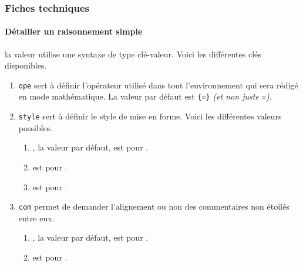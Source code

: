 \documentclass[12pt,a4paper]{article}
\begin{document}


\subsubsection{Fiches techniques}

\paragraph{Détailler un raisonnement simple} 


\IDoption{} la valeur utilise une syntaxe de type clé-valeur. Voici les différentes clés disponibles.

\begin{enumerate}
	\item \verb+ope+ sert à définir l'opérateur utilisé dans tout l'environnement qui sera rédigé en mode mathématique. 
	      La valeur par défaut est \verb+{=}+ \emph{(et non juste \texttt{=})}.

	\item \verb+style+ sert à définir le style de mise en forme. Voici les différentes valeurs possibles.
	      \begin{enumerate}
	      		\item {}, la valeur par défaut, est pour .

	      		\item {} est pour .

	      		\item {} est pour  .
	      \end{enumerate}

	\item \verb+com+ permet de demander l'alignement ou non des commentaires non étoilés entre eux.
	      \begin{enumerate}
	      		\item {}, la valeur par défaut, est pour  .

	      		\item {} est pour .

	      \end{enumerate}
\end{enumerate}
\end{document}
